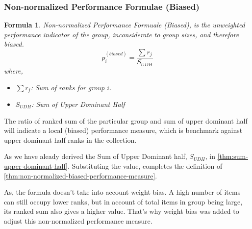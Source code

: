 \documentclass[a4paper,fleqn,review]{cas-sc}
\newtheorem{theorem}{Formula}
\begin{document}
\subsubsection{Non-normalized Performance Formulae (Biased)}


\begin{theorem}\label{thm:non-normalized-biased-performance-measure}
	Non-normalized Performance Formuale (Biased), is the unweighted performance indicator of the group, inconsiderate to group sizes, and therefore biased.
\begin{equation}
    p_i^{(biased)} = \frac{\sum r_j}{ S_{UDH} }
 \label{eq:p-biased}
\end{equation}
where,
\begin{itemize}
    \item[] \textbf{$\sum r_j$}: Sum of ranks for group $i$.
    \item[] \textbf{$S_{UDH}$}: Sum of Upper Dominant Half
\end{itemize}
\end{theorem}

\begin{pot}[\ref{thm:non-normalized-biased-performance-measure}]
	The ratio of ranked sum of the particular group and sum of upper dominant half will indicate a local (biased) performance measure, which is benchmark against upper dominant half ranks in the collection. 
\end{pot}

As we have aleady derived the Sum of Upper Dominant half, $S_{UDH}$, in \autoref{thm:sum-upper-dominant-half}. Substituting the value, completes the definition of \autoref{thm:non-normalized-biased-performance-measure}.

As, the formula doesn't take into account weight bias. A high number of items can still occupy lower ranks, but in account of total items in group being large, its ranked sum also gives a higher value. That's why weight bias was added to adjust this non-normalized performance measure.
\end{document}
